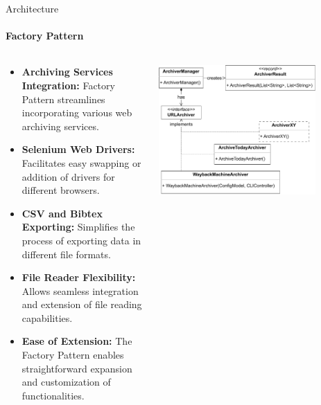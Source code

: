 \documentclass[
    ngerman,%
    authorontitle=true,
]{bfhbeamer}
\begin{document}
	\begin{frame}{Architecture}
		\framesubtitle{Factory Pattern}
		\begin{columns} %
			\begin{column}{0.6\textwidth} %
				\begin{itemize}
					\item \textbf{Archiving Services Integration:} Factory Pattern streamlines incorporating various web archiving services.
					\item \textbf{Selenium Web Drivers:} Facilitates easy swapping or addition of drivers for different browsers.
					\item \textbf{CSV and Bibtex Exporting:} Simplifies the process of exporting data in different file formats.
					\item \textbf{File Reader Flexibility:} Allows seamless integration and extension of file reading capabilities.
					\item \textbf{Ease of Extension:} The Factory Pattern enables straightforward expansion and customization of functionalities.
				\end{itemize}
			\end{column}
			\begin{column}{0.4\textwidth} %
				\begin{center}
					\includegraphics[width=0.8\textwidth]{pictures/final_presentation/URL_Archiver_Class_Diagram-ArchiverManager.pdf}
				\end{center}
			\end{column}
		\end{columns} %
	\end{frame}
\end{document}
